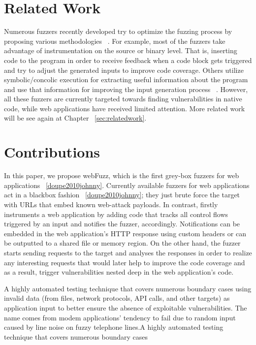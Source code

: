\section{Related Work}
 Numerous fuzzers recently developed try to optimize the fuzzing process by proposing various methodologies ~\cite{godefroid2012sage, stephens2016driller, rawat2017vuzzer, aschermann2019nautilus, aschermann2019redqueen, hoffman2020Was, osterlund2020parmesan }. For example, most of the fuzzers take advantage of instrumentation on the source or binary level. That is, inserting code to the program in order to receive feedback when a code block gets
triggered and try to adjust the generated inputs to improve code coverage. Others utilize symbolic/concolic execution for extracting useful information about the program and use that information for improving the input generation process ~\cite{stephens2016driller,godefroid2005dart,godefroid2012sage}. However, all these fuzzers are currently targeted towards finding vulnerabilities in native code, while web applications have received limited attention. More related work will be see again at Chapter ~\ref{sec:relatedwork}.

\section{Contributions}
In this paper, we propose webFuzz, which is the first grey-box fuzzers for web applications ~\ref{doupe2010johnny}. Currently available fuzzers for web applications act in a blackbox fashion ~\ref{doupe2010johnny}; they just brute force the target with URLs that embed known web-attack payloads. In contrast, \pname{} firstly instruments a web application by adding code that tracks all control flows triggered by an input and notifies the fuzzer, accordingly. Notifications can be embedded in the web application's HTTP response using custom headers or can be outputted to a shared file or memory region. On the other hand, the fuzzer starts sending requests to the target and analyses the responses in order to realize any interesting requests that would later help to improve the code coverage and as a result, trigger vulnerabilities nested deep in the web application's code.



A highly automated testing technique that covers numerous boundary cases
using invalid data (from files, network protocols, API calls, and other targets)
as application input to better ensure the absence of exploitable vulnerabilities.
The name comes from modem applications’ tendency to fail due
to random input caused by line noise on fuzzy telephone lines.A highly automated testing technique that covers numerous boundary cases

